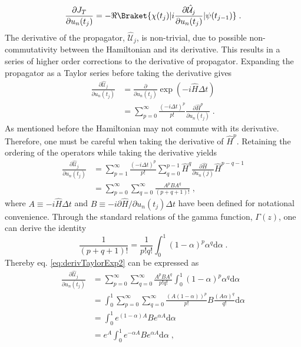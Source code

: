 \begin{equation}
	\frac{\partial J_T}{\partial u_n (t_j)} = - \Re \Braket{\chi (t_j) | i \frac{ \partial \hat{\mathcal{U}}_{j}}{\partial u_n (t_j)} | \psi (t_{j-1})} \; .
	\label{eq:gradientForBack}
\end{equation}
The derivative of the propagator, $\hat{\mathcal{U}}_{j}$, is non-trivial, due to possible non-commutativity between the Hamiltonian and its derivative. This results in a series of higher order corrections to the derivative of propagator.
Expanding the propagator as a Taylor series before taking the derivative gives
\begin{align}
	\frac{\partial \hat{\mathcal{U}}_{j}}{\partial u_n (t_j)} &= \frac{\partial}{\partial u_n (t_j)}  \exp \left( -i \hat{H} \Delta t \right) \nonumber \\
	&= \sum_{p = 0}^{\infty} \frac{( -i \Delta t  )^p}{p!} \frac{\partial \hat{H}^p}{\partial u_n (t_j)} \; .  
	\label{eq:derivTaylorExp}
\end{align}
As mentioned before the Hamiltonian may not commute with its derivative. Therefore, one must be careful when taking the derivative of $\hat{H}^p$. Retaining the ordering of the operators while taking the derivative yields
\begin{align}
	\frac{\partial \hat{\mathcal{U}}_{j}}{\partial u_n (t_j)} &= \sum_{p=1}^{\infty} \frac{ \left( -i \Delta t \right) ^p }{p!} \sum_{q=0}^{p-1} \hat{H}^q \frac{\partial \hat{H}}{\partial u_n (j)} \hat{H}^{p-q-1} \nonumber \\
	&= \sum_{p=0}^{\infty} \sum_{q=0}^{\infty} \frac{A^p B A^q}{(p+q+1)!} \; , \label{eq:derivTaylorExp2}
\end{align} 
where $A \equiv -i \hat{H} \Delta t$ and $B \equiv -i \partial \hat{H}/\partial u_n (t_j) \Delta t$ have been defined for notational convenience. Through the standard relations of the gamma function, $\Gamma (z)$, one can derive the identity
\begin{equation}
	\frac{1}{(p+q+1)!} = \frac{1}{p! q !} \int_{0}^{1} (1-\alpha)^p \alpha^q \mathrm{d}\alpha \; .
\end{equation}
Thereby eq. \eqref{eq:derivTaylorExp2} can be expressed as
\begin{align}
	\frac{\partial \hat{\mathcal{U}}_{j}}{\partial u_n (t_j)} &= \sum_{p=0}^{\infty} \sum_{q=0}^{\infty} \frac{A^p B A^q}{p! q !}  \int_{0}^{1} (1-\alpha)^p \alpha^q \mathrm{d}\alpha \nonumber \\
	&= \int_{0}^{1} \sum_{p=0}^{\infty} \sum_{q=0}^{\infty} \frac{(A (1- \alpha))^p}{p!} B \frac{(A \alpha)^q}{q!}  \mathrm{d}\alpha \nonumber \\
	&= \int_{0}^{1} e^{ (1- \alpha) A} B e^{ \alpha A} \mathrm{d}\alpha \nonumber \\
	 &= e^A \int_{0}^{1} e^{ - \alpha A} B e^{ \alpha A} \mathrm{d}\alpha \; , \label{eq:eq:derivTaylorExp3}
\end{align}
